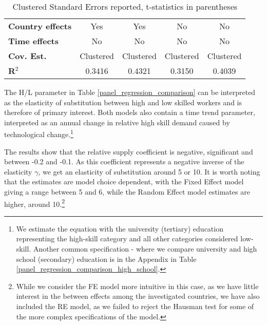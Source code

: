 \documentclass[11pt]{article}
\begin{document}
\begin{table}[!htbp]
\begin{center}
{\begin{tabular}{lcccc}
\textbf{Country effects}                 &            Yes           &      Yes      &    No               &         No         \\
\textbf{Time effects}                 &            No           &      No      &    No               &         No         \\
\textbf{Cov. Est.}               &          Clustered           &    Clustered     &     Clustered     &     Clustered      \\
\textbf{R$^{2}$}  &            0.3416            &      0.4321      &       0.3150      &       0.4039       \\
\bottomrule
\end{tabular}

}
\caption*{\footnotesize Clustered Standard Errors reported, t-statistics in parentheses}
\end{center}
\end{table}

The H/L parameter in Table \ref{panel_regression_comparison} can be interpreted as the elasticity of substitution between high and low skilled workers and is therefore of primary interest. Both models also contain a time trend parameter, interpreted as an annual change in relative high skill demand caused by technological change.\footnote{We estimate the equation with the university (tertiary) education representing the high-skill category and all other categories considered low-skill. Another common specification - where we compare university and high school (secondary) education is in the Appendix in Table \ref{panel_regression_comparison_high_school}.}

The results show that the relative supply coefficient is negative, significant and between -0.2 and -0.1. As this coefficient represents a negative inverse of the elasticity $\gamma$, we get an elasticity of substitution around 5 or 10. %
It is worth noting that the estimates are model choice dependent, with the Fixed Effect model giving a range between 5 and 6, while the Random Effect model estimates are higher, around 10.\footnote{While we consider the FE model more intuitive in this case, as we have little interest in the between effects among the investigated countries, we have also included the RE model, as we failed to reject the Hausman test for some of the more complex specifications of the model.}
\end{document}
